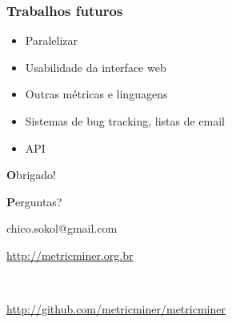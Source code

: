 \documentclass[brazil]{beamer}
\begin{document}
	\begin{frame}
		\frametitle{Trabalhos futuros}
		\begin{itemize}
			\item Paralelizar
			\item Usabilidade da interface web
			\item Outras métricas e linguagens
			\item Sistemas de bug tracking, listas de email
			\item API
		\end{itemize}
	\end{frame}

	\begin{frame}
		\centering \begin{Huge}\textbf Obrigado!\\ \vspace{0.5cm}\end{Huge}
		\centering \begin{huge}\textbf Perguntas?\\\end{huge}
		\vspace{0.7cm}
		\centering chico.sokol@gmail.com\\
		\centering \begin{scriptsize}\url{http://metricminer.org.br}\end{scriptsize}\\
		\centering \begin{scriptsize}\url{http://github.com/metricminer/metricminer}\end{scriptsize}\\
	\end{frame}





\end{document}
